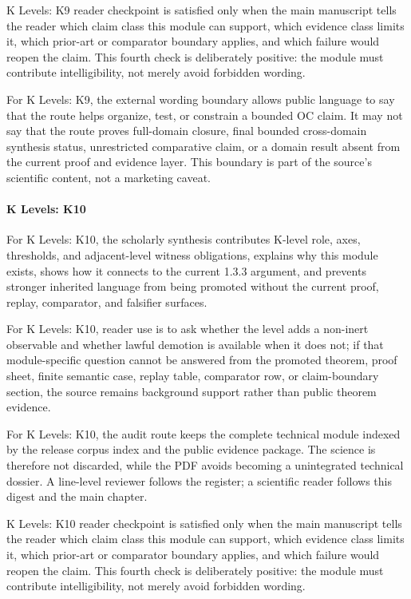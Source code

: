 K Levels: K9 reader checkpoint is satisfied only when the main manuscript tells the reader which claim class this module can support, which evidence class limits it, which prior-art or comparator boundary applies, and which failure would reopen the claim. This fourth check is deliberately positive: the module must contribute intelligibility, not merely avoid forbidden wording.


For K Levels: K9, the external wording boundary allows public language to say that the route helps organize, test, or constrain a bounded OC claim. It may not say that the route proves full-domain closure, final bounded cross-domain synthesis status, unrestricted comparative claim, or a domain result absent from the current proof and evidence layer. This boundary is part of the source's scientific content, not a marketing caveat.


\paragraph{K Levels: K10}

For K Levels: K10, the scholarly synthesis contributes K-level role, axes, thresholds, and adjacent-level witness obligations, explains why this module exists, shows how it connects to the current 1.3.3 argument, and prevents stronger inherited language from being promoted without the current proof, replay, comparator, and falsifier surfaces.


For K Levels: K10, reader use is to ask whether the level adds a non-inert observable and whether lawful demotion is available when it does not; if that module-specific question cannot be answered from the promoted theorem, proof sheet, finite semantic case, replay table, comparator row, or claim-boundary section, the source remains background support rather than public theorem evidence.


For K Levels: K10, the audit route keeps the complete technical module indexed by the release corpus index and the public evidence package. The science is therefore not discarded, while the PDF avoids becoming a unintegrated technical dossier. A line-level reviewer follows the register; a scientific reader follows this digest and the main chapter.


K Levels: K10 reader checkpoint is satisfied only when the main manuscript tells the reader which claim class this module can support, which evidence class limits it, which prior-art or comparator boundary applies, and which failure would reopen the claim. This fourth check is deliberately positive: the module must contribute intelligibility, not merely avoid forbidden wording.


